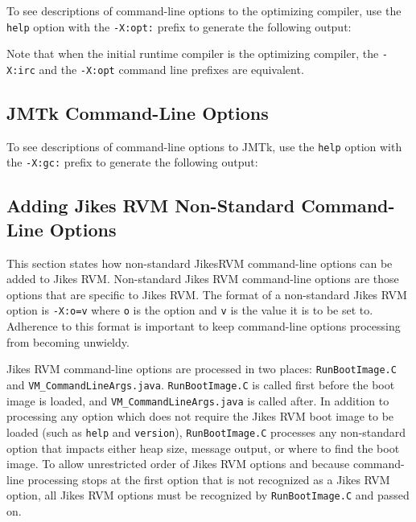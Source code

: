 To see descriptions of command-line options to the optimizing compiler,
use the {\tt help} option with the {\tt -X:opt:} prefix 
to generate the following output:

\T \begin{tiny}

\T \end{tiny}

Note that when the initial runtime compiler is the optimizing compiler, 
the {\tt -X:irc} and the {\tt -X:opt} command line prefixes are equivalent.

\subsection{JMTk Command-Line Options}
\label{section:jmtkoptions}

To see descriptions of command-line options to JMTk,
use the {\tt help} option with the {\tt -X:gc:} prefix 
to generate the following output:

\T \begin{tiny}

\T \end{tiny}

\subsection{Adding Jikes RVM Non-Standard Command-Line Options}
This section states how non-standard Jikes\trademark RVM command-line
options can be added to Jikes RVM.  Non-standard Jikes RVM
command-line options are those options that are specific to Jikes RVM.
The format of a non-standard Jikes RVM option is {\tt -X:o=v} where
{\tt o} is the option and {\tt v} is the value it is to be set to.
Adherence to this format is important to keep command-line options
processing from becoming unwieldy.

Jikes RVM command-line options are processed in two places: 
{\tt RunBootImage.C} and {\tt VM\_CommandLineArgs.java}.  
{\tt RunBootImage.C} is called first before the boot image is loaded, and
{\tt VM\_CommandLineArgs.java} is called after.  In addition to
processing any option which does not require the Jikes RVM boot image
to be loaded (such as {\tt help} and {\tt version}), 
{\tt RunBootImage.C} processes any non-standard option that impacts either
heap size, message output, or where to find the boot image.  To allow
unrestricted order of Jikes RVM options and because command-line processing
stops at the first option that is not recognized as a Jikes RVM
option, all Jikes RVM options must be recognized by {\tt RunBootImage.C}
and passed on.

\JikesTMFooter
